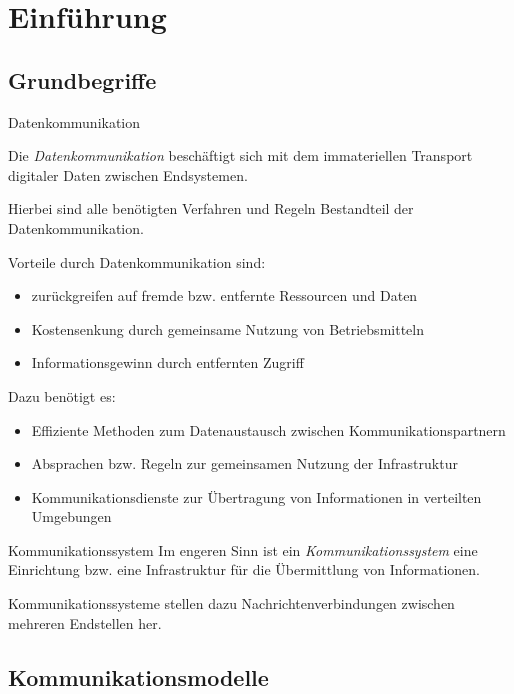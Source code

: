 \section{Einführung}

\subsection{Grundbegriffe}

\begin{defi}{Datenkommunikation}

    Die \emph{Datenkommunikation} beschäftigt sich mit dem immateriellen Transport digitaler Daten zwischen Endsystemen.

    Hierbei sind alle benötigten Verfahren und Regeln Bestandteil der Datenkommunikation.

    Vorteile durch Datenkommunikation sind:
    \begin{itemize}
        \item zurückgreifen auf fremde bzw. entfernte Ressourcen und Daten
        \item Kostensenkung durch gemeinsame Nutzung von Betriebsmitteln
        \item Informationsgewinn durch entfernten Zugriff
    \end{itemize}

    Dazu benötigt es:
    \begin{itemize}
        \item Effiziente Methoden zum Datenaustausch zwischen Kommunikationspartnern
        \item Absprachen bzw. Regeln zur gemeinsamen Nutzung der Infrastruktur
        \item Kommunikationsdienste zur Übertragung von Informationen in verteilten Umgebungen
    \end{itemize}
\end{defi}

\begin{defi}{Kommunikationssystem}
    Im engeren Sinn ist ein \emph{Kommunikationssystem} eine Einrichtung bzw. eine Infrastruktur für die Übermittlung von Informationen.

    Kommunikationssysteme stellen dazu Nachrichtenverbindungen zwischen mehreren Endstellen her.
\end{defi}

\subsection{Kommunikationsmodelle}

